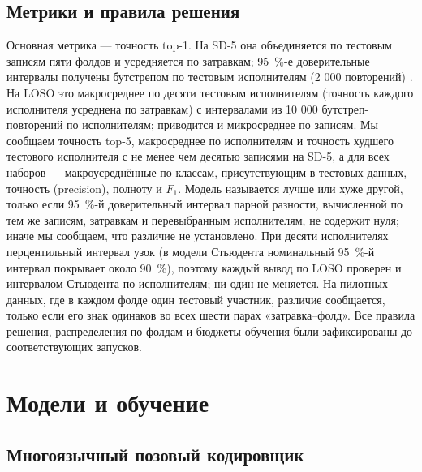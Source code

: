 \documentclass[a4paper,fleqn]{cas-dc}
\begin{document}
\hypertarget{ux43cux435ux442ux440ux438ux43aux438-ux438-ux43fux440ux430ux432ux438ux43bux430-ux440ux435ux448ux435ux43dux438ux44f}{%
\subsection{Метрики и правила решения}\label{ux43cux435ux442ux440ux438ux43aux438-ux438-ux43fux440ux430ux432ux438ux43bux430-ux440ux435ux448ux435ux43dux438ux44f}}

Основная метрика --- точность top-1. На SD-5 она объединяется по тестовым записям пяти фолдов и усредняется по затравкам; 95~\%-е доверительные интервалы получены бутстрепом по тестовым исполнителям (2 000 повторений) \cite{2016_efron_hastie_casi}. На LOSO это макросреднее по десяти тестовым исполнителям (точность каждого исполнителя усреднена по затравкам) с интервалами из 10 000 бутстреп-повторений по исполнителям; приводится и микросреднее по записям. Мы сообщаем точность top-5, макросреднее по исполнителям и точность худшего тестового исполнителя с не менее чем десятью записями на SD-5, а для всех наборов --- макроусреднённые по классам, присутствующим в тестовых данных, точность (precision), полноту и \(F_1\). Модель называется лучше или хуже другой, только если 95~\%-й доверительный интервал парной разности, вычисленной по тем же записям, затравкам и перевыбранным исполнителям, не содержит нуля; иначе мы сообщаем, что различие не установлено. При десяти исполнителях перцентильный интервал узок (в модели Стьюдента номинальный 95~\%-й интервал покрывает около 90~\%), поэтому каждый вывод по LOSO проверен и интервалом Стьюдента по исполнителям; ни один не меняется. На пилотных данных, где в каждом фолде один тестовый участник, различие сообщается, только если его знак одинаков во всех шести парах «затравка--фолд». Все правила решения, распределения по фолдам и бюджеты обучения были зафиксированы до соответствующих запусков.

\hypertarget{ux43cux43eux434ux435ux43bux438-ux438-ux43eux431ux443ux447ux435ux43dux438ux435}{%
\section{Модели и обучение}\label{ux43cux43eux434ux435ux43bux438-ux438-ux43eux431ux443ux447ux435ux43dux438ux435}}

\hypertarget{ux43cux43dux43eux433ux43eux44fux437ux44bux447ux43dux44bux439-ux43fux43eux437ux43eux432ux44bux439-ux43aux43eux434ux438ux440ux43eux432ux449ux438ux43a}{%
\subsection{Многоязычный позовый кодировщик}\label{ux43cux43dux43eux433ux43eux44fux437ux44bux447ux43dux44bux439-ux43fux43eux437ux43eux432ux44bux439-ux43aux43eux434ux438ux440ux43eux432ux449ux438ux43a}}
\end{document}

